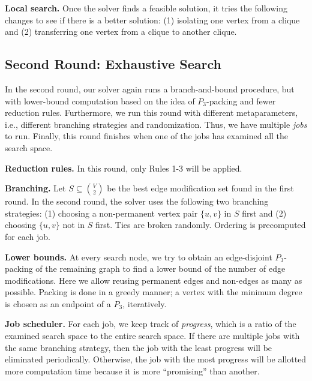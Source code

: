 \documentclass[a4paper,UKenglish,cleveref, autoref, thm-restate]{lipics-v2021}
\begin{document}
\textbf{Local search.} Once the solver finds a feasible solution, it tries the following changes to see if there is a better solution: (1) isolating one vertex from a clique and (2) transferring one vertex from a clique to another clique.


\enlargethispage{\baselineskip}

\subsection{Second Round: Exhaustive Search}

In the second round, our solver again runs a branch-and-bound procedure, but with lower-bound computation based on the idea of $P_3$-packing \cite{bevern2018parameterizing} and fewer reduction rules. Furthermore, we run this round with different metaparameters, i.e., different branching strategies and randomization. Thus, we have multiple \textit{jobs} to run. Finally, this round finishes when one of the jobs has examined all the search space.

\textbf{Reduction rules.} In this round, only Rules 1-3 will be applied.

\textbf{Branching.} Let $S \subseteq \binom{V}{2}$ be the best edge modification set found in the first round. In the second round, the solver uses the following two branching strategies: (1) choosing a non-permanent vertex pair $\{u,v\}$ in $S$ first and (2) choosing $\{u,v\}$ not in $S$ first. Ties are broken randomly. Ordering is precomputed for each job.

\textbf{Lower bounds.} At every search node, we try to obtain an edge-disjoint $P_3$-packing of the remaining graph to find a lower bound of the number of edge modifications. Here we allow reusing permanent edges and non-edges as many as possible. Packing is done in a greedy manner; a vertex with the minimum degree is chosen as an endpoint of a $P_3$, iteratively.

\textbf{Job scheduler.} For each job, we keep track of \textit{progress}, which is a ratio of the examined search space to the entire search space. If there are multiple jobs with the same branching strategy, then the job with the least progress will be eliminated periodically. Otherwise, the job with the most progress will be allotted more computation time because it is more ``promising'' than another.




\end{document}
